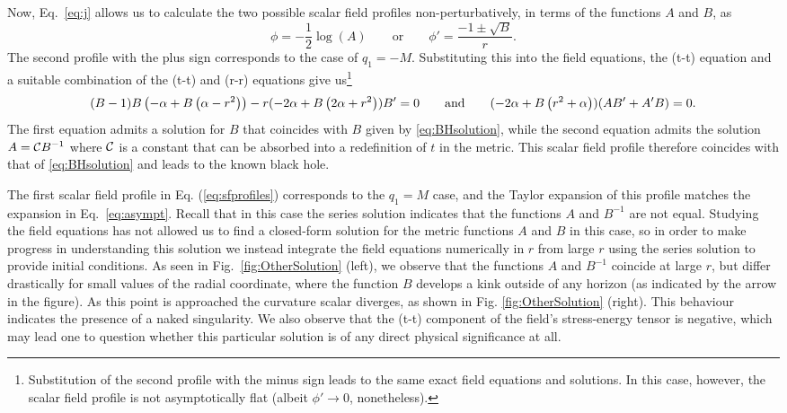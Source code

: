 \documentclass[reprint,amsmath,amssymbGaps,onecolumn,notitlepage,nofootinbib]{revtex4-1}
\begin{document}
Now, Eq.~\eqref{eq:j} allows us to calculate the two possible scalar field profiles non-perturbatively,
in terms of the functions $A$ and $B$, as 
\begin{equation}
\phi = -\frac{1}{2} \log(A) \qquad \mbox{or} \qquad \phi' = \frac{-1\pm\sqrt{B}}{r}.
\label{eq:sfprofiles}
\end{equation}
The second profile with the plus sign corresponds to the case of $q_1=-M$. 
Substituting this into the field equations, the (t-t) equation and a suitable combination of the (t-t) and (r-r) equations give us\footnote{Substitution of the second profile with the minus sign leads to the same exact field equations and solutions. In this case, however, the scalar field profile is not asymptotically flat (albeit $\phi' \to 0$, nonetheless).}
\begin{equation}
(B-1) B \left(-\alpha + B \left(\alpha-r^2\right) \right)-r(-2\alpha +B \left(2\alpha + r^2 \right))B'=0 \qquad {\rm and} \qquad (-2\alpha +B \left(r^2+\alpha \right))(A B' + A' B) = 0.
\end{equation}
The first equation admits a solution for $B$  that coincides with $B$ given by \eqref{eq:BHsolution}, while the second equation admits the solution $A =  {\cal C} B^{-1}$ where ${\cal C}$ is a constant  that can be absorbed into a redefinition of $t$ in the metric.  This scalar field profile therefore coincides with that of \eqref{eq:BHsolution} and leads to the known black hole. 

The first scalar field profile in Eq. (\ref{eq:sfprofiles}) corresponds to the $q_1=M$ case, and the Taylor expansion of this profile matches the expansion in  Eq.~\eqref{eq:asympt}. Recall that in this case the series solution indicates that the functions $A$ and $B^{-1}$ are not equal. Studying the field equations has not allowed us to find a closed-form solution for the metric functions $A$ and $B$ in this case, so in order to make progress in understanding this solution we instead integrate the field equations numerically in $r$ from large $r$ using the series solution to provide initial conditions. As seen in Fig.~\ref{fig:OtherSolution} (left), we observe that the functions $A$ and $B^{-1}$ coincide at large $r$, but differ drastically for small values of the radial coordinate, where the function $B$ develops a kink outside of any horizon (as indicated by the arrow in the figure). As this point is approached the curvature scalar diverges, as shown in Fig. \ref{fig:OtherSolution} (right). This behaviour indicates the presence of a naked singularity. We also observe that the (t-t) component of the field's stress-energy tensor is negative, which may lead one to question whether this particular solution is of any direct physical significance at all.
\end{document}
